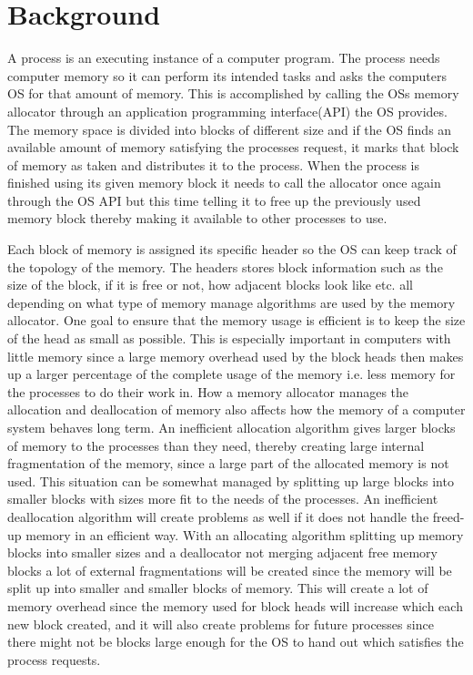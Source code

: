 \documentclass{article}
\begin{document}
\section{Background}\label{background}
A process is an executing instance of a computer program. The process needs computer memory so it can 
perform its intended tasks and asks the computers OS for that amount of memory. This is accomplished by 
calling the OSs memory allocator through an application programming interface(API) the OS provides. 
The memory space is divided into blocks of different size and if the OS finds an available amount of memory 
satisfying the processes request, it marks that block of memory as taken and distributes it to the 
process. When the process is finished using its given memory block it needs to call the allocator once 
again through the OS API but this time telling it to free up the previously used memory block thereby 
making it available to other processes to use.

Each block of memory is assigned its specific header so the OS can keep track of the topology of the memory. The 
headers stores block information such as the size of the block, if it is free or not, how adjacent blocks look 
like etc. all depending on what type of memory manage algorithms are used by the memory allocator. One goal to 
ensure that the memory usage is efficient is to keep the size of the head as small as possible. This is especially 
important in computers with little memory since a large memory overhead used by the block heads then makes up a larger 
percentage of the complete usage of the memory i.e. less memory for the processes to do their work in. How a memory 
allocator manages the allocation and deallocation of 
memory also affects how the memory of a computer system behaves long term. An inefficient allocation algorithm gives 
larger blocks of memory to the processes than they need, thereby creating large internal fragmentation of the memory, 
since a large part of the allocated memory is not used. This situation can be somewhat managed by splitting up large blocks
 into smaller blocks with sizes more fit to the needs of the processes. An inefficient deallocation algorithm will create
 problems as well if it does not handle the freed-up memory in an efficient way. With an allocating algorithm splitting 
 up memory blocks into smaller sizes and a deallocator not merging adjacent free memory blocks a lot of external fragmentations will be 
created since the memory will be split up into smaller and smaller blocks of memory. This will create a lot of
memory overhead since the memory used for block heads will increase which each new block created, and it will also 
create problems for future processes since there might not be blocks large enough for the OS to hand out which satisfies the process requests.
\end{document}

